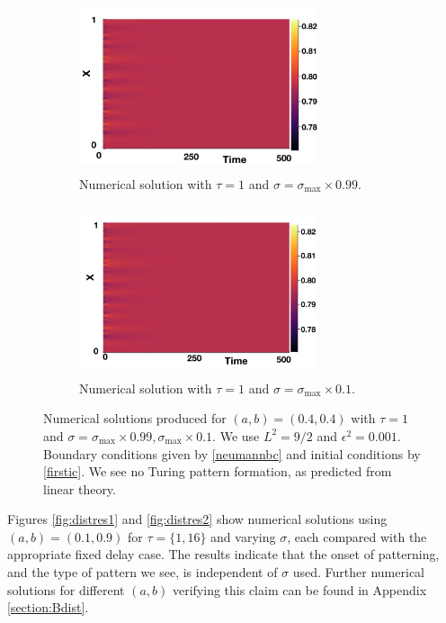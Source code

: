 \begin{figure}[H]
    \centering
    \begin{subfigure}[t]{0.45\textwidth}
        \centering
        \includegraphics[width=7cm,height=5cm]{distp2sig1.png}
        \caption{Numerical solution with $\tau=1$ and $\sigma=\sigma_{\max}\times0.99$.}
        \label{}
    \end{subfigure}
    \hfill
    \begin{subfigure}[t]{0.45\textwidth}
        \centering
        \includegraphics[width=7cm,height=5cm]{distp2sig2.png}
        \caption{Numerical solution with $\tau=1$ and $\sigma=\sigma_{\max}\times0.1$.}
        \label{}
    \end{subfigure}
    \caption{Numerical solutions produced for $(a,b)=(0.4,0.4)$ with $\tau=1$ and $\sigma=\sigma_{\max}\times0.99, \sigma_{\max}\times0.1$. We use $L^2=9/2$ and $\epsilon^2=0.001$. Boundary conditions given by \eqref{neumannbc} and initial conditions by \eqref{firstic}. We see no Turing pattern formation, as predicted from linear theory.}
    \label{fig:testdist2}
\end{figure}
Figures \ref{fig:distres1} and \ref{fig:distres2} show numerical solutions using $(a,b)=(0.1,0.9)$ for $\tau=\{1,16\}$ and varying $\sigma$, each compared with the appropriate fixed delay case. The results indicate that the onset of patterning, and the type of pattern we see, is independent of $\sigma$ used. Further numerical solutions for different $(a,b)$ verifying this claim can be found in Appendix \ref{section:Bdist}.

